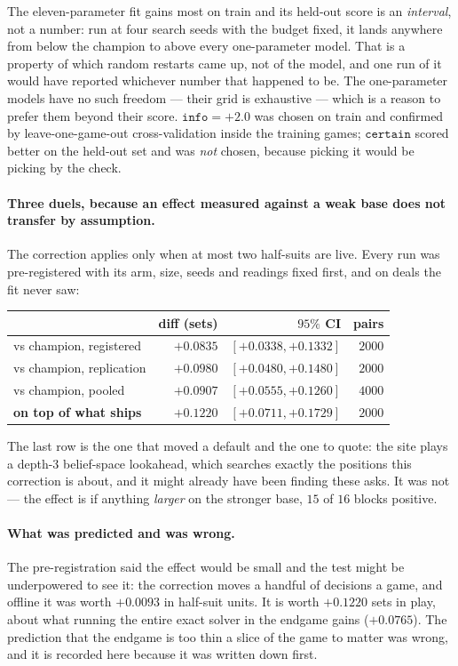 \documentclass[11pt,a4paper]{article}
\begin{document}
The eleven-parameter fit gains most on train and its held-out score is an
\emph{interval}, not a number: run at four search seeds with the budget fixed,
it lands anywhere from below the champion to above every one-parameter model.
That is a property of which random restarts came up, not of the model, and one
run of it would have reported whichever number that happened to be. The
one-parameter models have no such freedom --- their grid is exhaustive --- which
is a reason to prefer them beyond their score. $\mathtt{info} = +2.0$ was
chosen on train and confirmed by leave-one-game-out cross-validation inside the
training games; $\mathtt{certain}$ scored better on the held-out set and was
\emph{not} chosen, because picking it would be picking by the check.

\paragraph{Three duels, because an effect measured against a weak base does not
transfer by assumption.} The correction applies only when at most two
half-suits are live. Every run was pre-registered with its arm, size, seeds and
readings fixed first, and on deals the fit never saw:

\begin{center}
\begin{tabular}{lrrr}
\toprule
& diff (sets) & $95\%$ CI & pairs \\
\midrule
vs champion, registered   & $+0.0835$ & $[+0.0338, +0.1332]$ & $2000$ \\
vs champion, replication  & $+0.0980$ & $[+0.0480, +0.1480]$ & $2000$ \\
vs champion, pooled       & $+0.0907$ & $[+0.0555, +0.1260]$ & $4000$ \\
\textbf{on top of what ships} & $\mathbf{+0.1220}$ &
  $\mathbf{[+0.0711, +0.1729]}$ & $2000$ \\
\bottomrule
\end{tabular}
\end{center}

The last row is the one that moved a default and the one to quote: the site
plays a depth-3 belief-space lookahead, which searches exactly the positions
this correction is about, and it might already have been finding these asks.
It was not --- the effect is if anything \emph{larger} on the stronger base,
$15$ of $16$ blocks positive.

\paragraph{What was predicted and was wrong.} The pre-registration said the
effect would be small and the test might be underpowered to see it: the
correction moves a handful of decisions a game, and offline it was worth
$+0.0093$ in half-suit units. It is worth $+0.1220$ sets in play, about what
running the entire exact solver in the endgame gains ($+0.0765$). The
prediction that the endgame is too thin a slice of the game to matter was
wrong, and it is recorded here because it was written down first.
\end{document}
